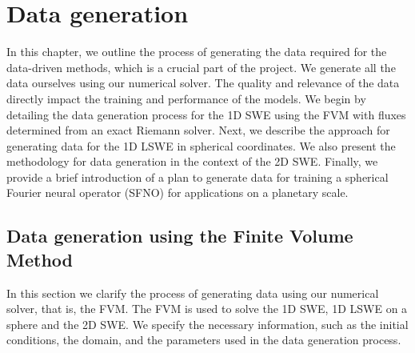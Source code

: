 \chapter{Data generation}\label{ch:method}
In this chapter, we outline the process of generating the data required for the data-driven methods, which is a crucial part of the project.
We generate all the data ourselves using our numerical solver.
The quality and relevance of the data directly impact the training and performance of the models.
We begin by detailing the data generation process for the 1D SWE using the FVM with fluxes determined from an exact Riemann solver.
Next, we describe the approach for generating data for the 1D LSWE in spherical coordinates.
We also present the methodology for data generation in the context of the 2D SWE.
Finally, we provide a brief introduction of a plan to generate data for training a spherical Fourier neural operator (SFNO) for applications on a planetary scale.

\section{Data generation using the Finite Volume Method}\label{sec:data_generation_fvm}
In this section we clarify the process of generating data using our numerical solver, that is, the FVM.
The FVM is used to solve the 1D SWE, 1D LSWE on a sphere and the 2D SWE.
We specify the necessary information, such as the initial conditions, the domain, and the parameters used in the data generation process.

